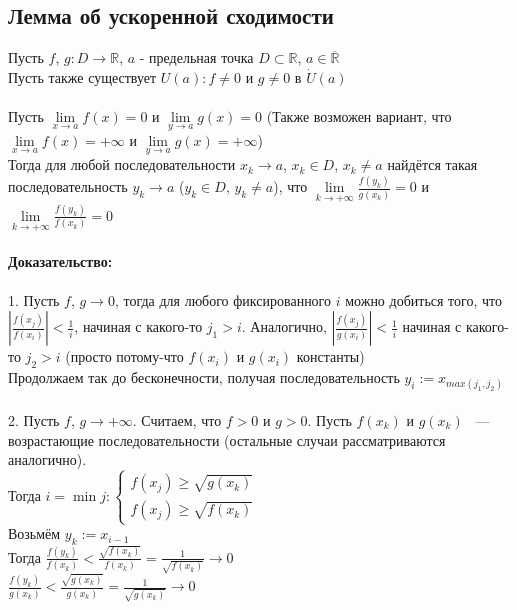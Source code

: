 \documentclass[../main.tex]{subfiles}
\begin{document}
\newpage


\subsection{Лемма об ускоренной сходимости}

Пусть $f$, $g : D \rightarrow \mathbb{R}$, $a$ - предельная точка $D \subset \mathbb{R}$, $a \in \overline{\mathbb{R}}$\\
Пусть также существует $U(a) : f \neq 0$ и $g \neq 0$ в $\dot{U}(a)$\\\\
Пусть $\lim\limits_{x \rightarrow a} f(x) = 0$ и $\lim\limits_{y \rightarrow a} g(x) = 0$ (Также возможен вариант, что $\lim\limits_{x \rightarrow a} f(x) = + \infty$ и $\lim\limits_{y \rightarrow a} g(x) = +\infty$)\\
Тогда для любой последовательности $x_k \rightarrow a$, $x_k \in D$, $x_k \neq a$ найдётся такая последовательность $y_k \rightarrow a$ ($y_k \in D$, $y_k \neq a$), что 
$\lim\limits_{k \rightarrow +\infty} \frac{f(y_k)}{g(x_k)} = 0$ и $\lim\limits_{k \rightarrow +\infty} \frac{f(y_k)}{f(x_k)} = 0$ \\\\
\textbf{Доказательство:}\\\\
1. Пусть $f$, $g \rightarrow 0$, тогда для любого фиксированного $i$ можно добиться того, что $\left| \frac{f(x_j)}{f(x_i)} \right| < \frac{1}{i}$, начиная с какого-то $j_1 > i$. Аналогично, $\left| \frac{f(x_j)}{g(x_i)} \right| < \frac{1}{i}$ начиная с какого-то $j_2 > i$ (просто потому-что $f(x_i)$ и $g(x_i)$ константы)\\
Продолжаем так до бесконечности, получая последовательность $y_i := x_{max(j_1, j_2)}$ \\\\
2. Пусть $f$, $g \rightarrow +\infty$. Считаем, что $f > 0$ и $g > 0$. Пусть $f(x_k)$ и $g(x_k)$ ~--- возрастающие последовательности (остальные случаи рассматриваются аналогично). \\
Тогда $i = \min j: \begin{cases} f(x_j) \geq \sqrt{g(x_k)} \\ f(x_j) \geq \sqrt{f(x_k)} \end{cases}$\\
Возьмём $y_k := x_{i - 1}$\\
Тогда $\frac{f(y_k)}{f(x_k)} < \frac{\sqrt{f(x_k)}}{f(x_k)} = \frac{1}{\sqrt{f(x_k)}} \rightarrow 0$\\
$\frac{f(y_k)}{g(x_k)} < \frac{\sqrt{g(x_k)}}{g(x_k)}= \frac{1}{\sqrt{g(x_k)}} \rightarrow 0$
\end{document}
